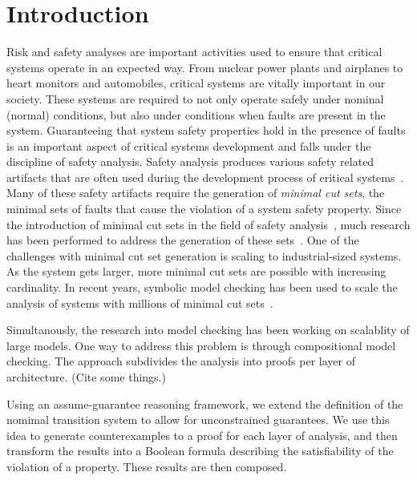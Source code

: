 \section{Introduction}
\label{sec:intro}

Risk and safety analyses are important activities used to ensure that critical systems operate in an expected way. From nuclear power plants and airplanes to heart monitors and automobiles, critical systems are vitally important in our society. These systems are required to not only operate safely under nominal (normal) conditions, but also under conditions when faults are present in the system. Guaranteeing that system safety properties hold in the presence of faults is an important aspect of critical systems development and falls under the discipline of safety analysis. Safety analysis produces various safety related artifacts that are often used during the development process of critical systems~\cite{SAE:ARP4761,SAE:ARP4754A}. Many of these safety artifacts require the generation of \textit{minimal cut sets}, the minimal sets of faults that cause the violation of a system safety property. Since the introduction of minimal cut sets in the field of safety analysis~\cite{vesely1981fault}, much research has been performed to address the generation of these sets~\cite{fta:survey,rauzy1993new,historyFTA,Bozzano:2010:DSA:1951720,rausand2003system}. One of the challenges with minimal cut set generation is scaling to industrial-sized systems. As the system gets larger, more minimal cut sets are possible with increasing cardinality. In recent years, symbolic model checking has been used to scale the analysis of systems with millions of minimal cut sets~\cite{bieber2002combination,schafer2003combining,fta:survey,contractBasedDesign,symbFTA,DBLP:conf/cav/BozzanoCPJKPRT15}. 

Simultanously, the research into model checking has been working on scalablity of large models. One way to address this problem is through compositional model checking. The approach subdivides the analysis into proofs per layer of architecture. (Cite some things.)

Using an assume-guarantee reasoning framework, we extend the definition of the nomimal transition system to allow for unconstrained guarantees. We use this idea to generate counterexamples to a proof for each layer of analysis, and then transform the results into a Boolean formula describing the satisfiability of the violation of a property. These results are then composed. 

